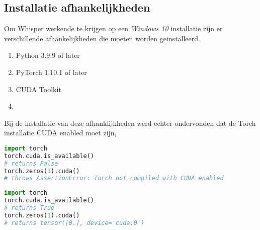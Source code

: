 \bigbreak{}

\subsection*{Installatie afhankelijkheden}

Om Whisper werkende te krijgen op een \textit{Windows 10} installatie zijn er verschillende afhankelijkheden die moeten worden geinstalleerd.

\bigbreak{}

\begin{enumerate}
    \item Python 3.9.9 of later 
    \item PyTorch 1.10.1 of later
    \item CUDA Toolkit
    \item 
\end{enumerate}

\bigbreak{}

Bij de installatie van deze afhanklijkheden werd echter ondervonden dat de Torch installatie CUDA enabled moet zijn, 


\begin{lstlisting}[language=python]
import torch
torch.cuda.is_available()
# returns False
torch.zeros(1).cuda()
# throws AssertionError: Torch not compiled with CUDA enabled
\end{lstlisting}


\begin{lstlisting}[language=python]
import torch
torch.cuda.is_available()
# returns True
torch.zeros(1).cuda()
# returns tensor([0.], device='cuda:0')
\end{lstlisting}


